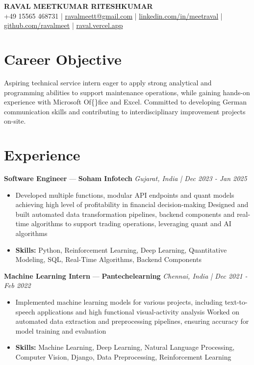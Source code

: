 \documentclass[a4paper,10pt]{article}
\begin{document}
\begin{center}
  {\Large\bfseries RAVAL MEETKUMAR RITESHKUMAR}\\[2pt]
  {\small +49 15565 468731 \;|\; \href{mailto:ravalmeett@gmail.com}{ravalmeett@gmail.com} \;|\; \href{https://www.linkedin.com/in/meetraval/}{linkedin.com/in/meetraval} \;|\; \href{https://github.com/ravalmeet}{github.com/ravalmeet} \;|\; \href{https://raval.vercel.app/}{raval.vercel.app}}
\end{center}
\vspace{-3pt}

\section*{Career Objective}
Aspiring technical service intern eager to apply strong analytical and programming abilities to support maintenance operations, while gaining hands-on experience with Microsoft Of\{\}fice and Excel. Committed to developing German communication skills and contributing to interdisciplinary improvement projects on-site.\par

\section*{Experience}
\textbf{Software Engineer} — \textbf{Soham Infotech} \hfill \textit{Gujarat, India \;|\; Dec 2023 - Jan 2025}\par
\vspace{1pt}
\begin{itemize}
  \item Developed multiple functions, modular API endpoints and quant models achieving high level of profitability in financial decision-making Designed and built automated data transformation pipelines, backend components and real-time algorithms to support trading operations, leveraging quant and AI algorithms
  \item \textbf{Skills:} Python, Reinforcement Learning, Deep Learning, Quantitative Modeling, SQL, Real-Time Algorithms, Backend Components
\end{itemize}
\vspace{3pt}
\textbf{Machine Learning Intern} — \textbf{Pantechelearning} \hfill \textit{Chennai, India \;|\; Dec 2021 - Feb 2022}\par
\vspace{1pt}
\begin{itemize}
  \item Implemented machine learning models for various projects, including text-to-speech applications and high functional visual-activity analysis Worked on automated data extraction and preprocessing pipelines, ensuring accuracy for model training and evaluation
  \item \textbf{Skills:} Machine Learning, Deep Learning, Natural Language Processing, Computer Vision, Django, Data Preprocessing, Reinforcement Learning
\end{itemize}
\end{document}
